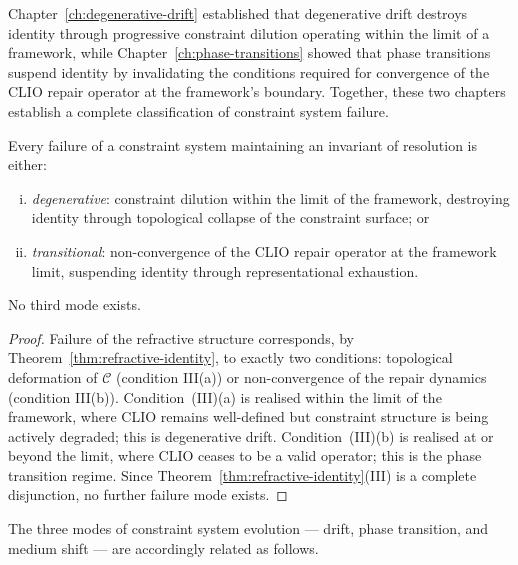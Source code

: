 \documentclass[11pt,openany]{book}
\begin{document}
Chapter~\ref{ch:degenerative-drift} established that
degenerative drift destroys identity through progressive
constraint dilution operating within the limit of a
framework, while Chapter~\ref{ch:phase-transitions} showed
that phase transitions suspend identity by invalidating the
conditions required for convergence of the CLIO repair
operator at the framework's boundary.  Together, these two
chapters establish a complete classification of constraint
system failure.

\begin{proposition}
\label{prop:completeness}
Every failure of a constraint system maintaining an
invariant of resolution is either:
\begin{enumerate}[(i)]
  \item \emph{degenerative}: constraint dilution within
    the limit of the framework, destroying identity through
    topological collapse of the constraint surface; or
  \item \emph{transitional}: non-convergence of the CLIO
    repair operator at the framework limit, suspending
    identity through representational exhaustion.
\end{enumerate}
No third mode exists.
\end{proposition}

\begin{proof}
Failure of the refractive structure corresponds, by
Theorem~\ref{thm:refractive-identity}, to exactly two
conditions: topological deformation of $\mathcal{C}$
(condition III(a)) or non-convergence of the repair
dynamics (condition III(b)).  Condition~(III)(a) is
realised within the limit of the framework, where CLIO
remains well-defined but constraint structure is being
actively degraded; this is degenerative drift.
Condition~(III)(b) is realised at or beyond the limit,
where CLIO ceases to be a valid operator; this is the
phase transition regime.  Since Theorem~\ref{thm:refractive-identity}(III)
is a complete disjunction, no further failure mode exists.
\end{proof}

The three modes of constraint system evolution --- drift,
phase transition, and medium shift --- are accordingly
related as follows.
\end{document}
